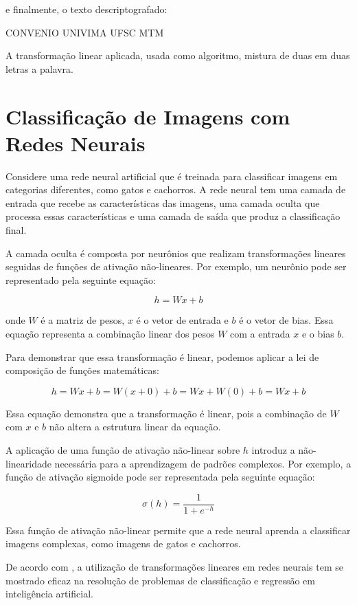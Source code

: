 \noindent e finalmente, o texto descriptografado:

\centerline{CONVENIO UNIVIMA UFSC MTM}

A transformação linear aplicada, usada como algoritmo, mistura de duas em duas letras a palavra.

\section{Classificação de Imagens com Redes Neurais}

Considere uma rede neural artificial que é treinada para classificar imagens em categorias diferentes, como gatos e cachorros. A rede neural tem uma camada de entrada que recebe as características das imagens, uma camada oculta que processa essas características e uma camada de saída que produz a classificação final.

A camada oculta é composta por neurônios que realizam transformações lineares seguidas de funções de ativação não-lineares. Por exemplo, um neurônio pode ser representado pela seguinte equação:

\begin{equation}
	h = Wx + b
\end{equation}

onde $W$ é a matriz de pesos, $x$ é o vetor de entrada e $b$ é o vetor de bias. Essa equação representa a combinação linear dos pesos $W$ com a entrada $x$ e o bias $b$.

Para demonstrar que essa transformação é linear, podemos aplicar a lei de composição de funções matemáticas:

\begin{equation}
	h = Wx + b = W(x + 0) + b = Wx + W(0) + b = Wx + b
\end{equation}

Essa equação demonstra que a transformação é linear, pois a combinação de $W$ com $x$ e $b$ não altera a estrutura linear da equação.

A aplicação de uma função de ativação não-linear sobre $h$ introduz a não-linearidade necessária para a aprendizagem de padrões complexos. Por exemplo, a função de ativação sigmoide pode ser representada pela seguinte equação:

\begin{equation}
	\sigma(h) = \frac{1}{1 + e^{-h}}
\end{equation}

Essa função de ativação não-linear permite que a rede neural aprenda a classificar imagens complexas, como imagens de gatos e cachorros.

De acordo com \cite{lecun2015}, a utilização de transformações lineares em redes neurais tem se mostrado eficaz na resolução de problemas de classificação e regressão em inteligência artificial.
